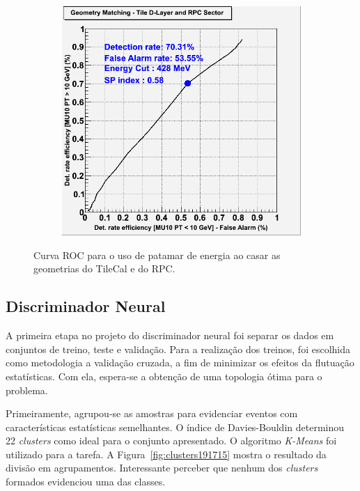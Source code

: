\begin{figure}[htpb!]
\begin{subfigure}[b]{0.45\textwidth}
                \includegraphics[width=\textwidth]{images/sglmuon/roc_perf_match_SL.png}
        \end{subfigure}
        \caption{Curva ROC para o uso de patamar de energia ao casar as
        geometrias do TileCal e do RPC.}
        \label{fig:ROCSL191715}
\end{figure}


\subsection*{Discriminador Neural}

A primeira etapa no projeto do discriminador neural foi separar os dados em
conjuntos de treino, teste e validação. Para a realização dos treinos, foi
escolhida como metodologia a validação cruzada, a fim de minimizar os efeitos da
flutuação estatísticas. Com ela, espera-se a obtenção de uma topologia ótima
para o problema.

Primeiramente, agrupou-se as amostras para evidenciar eventos com
características estatísticas semelhantes. O índice de Davies-Bouldin determinou
22 \emph{clusters} como ideal para o conjunto apresentado. O algoritmo
\emph{K-Means} foi utilizado para a tarefa. A Figura~\ref{fig:clusters191715}
mostra o resultado da divisão em agrupamentos. Interessante perceber que nenhum
dos \emph{clusters} formados evidenciou uma das classes.

